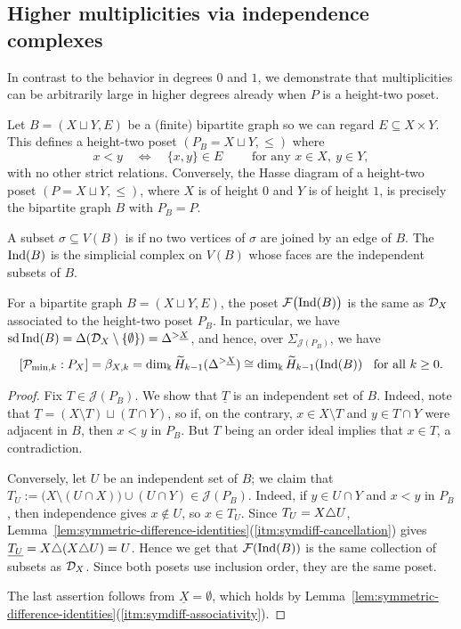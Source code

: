 \documentclass[a4paper,leqno]{amsart}
\begin{document}
\subsection{Higher multiplicities via independence complexes}
\label{subsec:higher-multiplicities}

In contrast to the behavior in degrees $0$ and $1$, we demonstrate that multiplicities can be arbitrarily large in higher degrees already when $P$ is a height-two poset.

Let $B=(X\sqcup Y,E)$ be a (finite) bipartite graph so we can regard $E\subseteq X\times Y$.  This defines a height-two poset $(P_B=X\sqcup Y, \le)$ where
\[
 x<y
 \quad\Leftrightarrow\quad
 \{x,y\}\in E
 \qquad \text{ for any } x\in X,\ y\in Y,
\]
with no other strict relations.  Conversely, the Hasse diagram of a height-two poset $(P=X\sqcup Y, \le)$, where $X$ is of height $0$ and $Y$ is of height $1$, is precisely the bipartite graph $B$ with $P_B=P$.

A subset $\sigma\subseteq V(B)$ is  if no two vertices of $\sigma$ are joined by an edge of $B$.  The  $\operatorname{Ind}(B)$ is the simplicial complex on $V(B)$ whose faces are the independent subsets of $B$.

\begin{prop}\label{prop:height-two-independence}
For a bipartite graph $B=(X\sqcup Y,E)$, the poset $\mathcal F\bigl(\operatorname{Ind}(B)\bigr)$ is the same as $\mathcal D_X$ associated to the height-two poset $P_B$. In particular, we have $\operatorname{sd}\operatorname{Ind}(B)=\Delta(\mathcal D_X\setminus\{\emptyset\}) = \Delta^{>\underline{X}}$, and hence, over $\Sigma_{\mathcal{J}(P_B)}$, we have
\[
 [\mathcal P_{\min,k}:P_X] = \beta_{X,k} = \dim_{\Bbbk}\widetilde H_{k-1}(\Delta^{>\underline{X}})
 \cong \dim_{\Bbbk}\widetilde H_{k-1}(\operatorname{Ind}(B))
 \;\;\text{ for all } k\ge 0.
\]
\end{prop}

\begin{proof}
Fix $T\in \mathcal{J}(P_B)$.  We show that $\underline{T}$ is an independent set of $B$.  Indeed, note that $\underline{T}=(X\setminus T)\sqcup(T\cap Y)$, so if, on the contrary, $x\in X\setminus T$ and $y\in T\cap Y$ were adjacent in $B$, then $x<y$ in $P_B$.  But $T$ being an order ideal implies that $x\in T$, a contradiction.

Conversely, let $U$ be an independent set of $B$; we claim that $T_U:=\bigl(X\setminus(U\cap X)\bigr)\cup(U\cap Y)\in \mathcal{J}(P_B)$.  Indeed, if $y\in U\cap Y$ and $x<y$ in $P_B$, then independence gives $x\notin U$, so $x\in T_U$. Since $T_U=X{\mathbin{\triangle}} U$, Lemma~\ref{lem:symmetric-difference-identities}\textup{(\ref{itm:symdiff-cancellation})} gives
$\underline{T_U}=X{\mathbin{\triangle}}(X{\mathbin{\triangle}} U)=U$.
Hence we get that $\mathcal F(\operatorname{Ind}(B))$ is the same collection of subsets as $\mathcal D_X$.  Since both posets use inclusion order, they are the same poset.

The last assertion follows from $\underline{X}=\emptyset$, which holds by Lemma~\ref{lem:symmetric-difference-identities}\textup{(\ref{itm:symdiff-associativity})}.
\end{proof}
\end{document}
